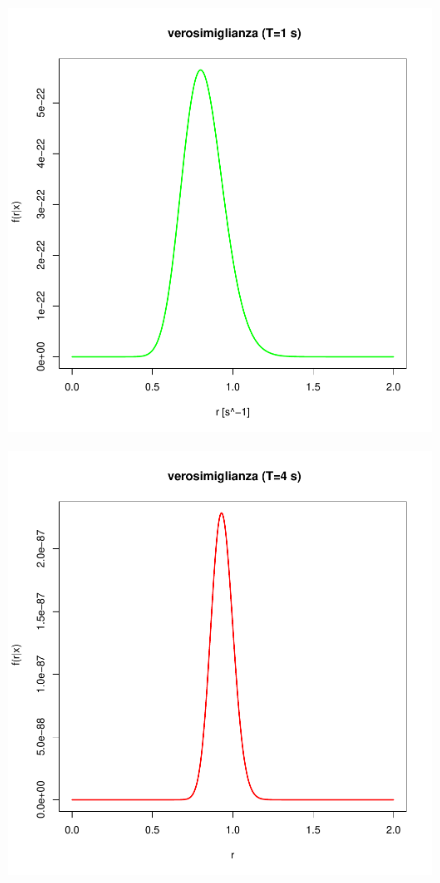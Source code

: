 \documentclass[10pt,oneside,a4paper]{article}
\begin{document}
\begin{figure}
\centering
\includegraphics{verosimiglianza1sec.pdf}
\label{fig:verosimiglianza1sec}
\end{figure}

\begin{figure}
\centering
\includegraphics{verosimiglianza4sec.pdf}
\label{fig:verosimiglianza4sec}
\end{figure}
\end{document}
